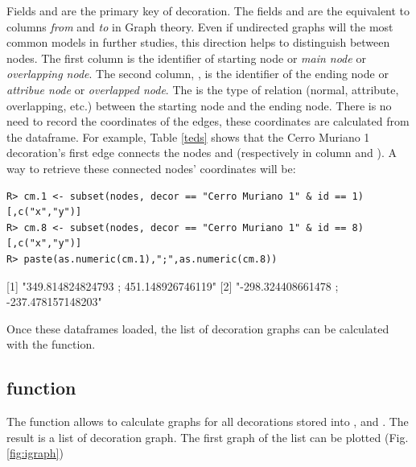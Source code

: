 \documentclass[article]{jss}\usepackage{knitr}
\begin{document}
Fields  and  are the primary key of decoration. The fields  and  are the equivalent to columns \emph{from} and \emph{to} in Graph theory. Even if undirected graphs will the most common models in further studies, this direction helps to distinguish between nodes. The first column  is the identifier of starting node or \emph{main node} or \emph{overlapping node}. The second column, , is the identifier of the ending node or \emph{attribue node} or \emph{overlapped node}. The  is the type of relation (normal, attribute, overlapping, etc.) between the starting node and the ending node. There is no need to record the coordinates of the edges, these coordinates are calculated from the  dataframe. For example, Table \ref{teds} shows that the Cerro Muriano 1 decoration's first edge connects the nodes  and  (respectively in column  and ). A way to retrieve these connected nodes' coordinates will be:

\begin{kframe}
\begin{verbatim}
R> cm.1 <- subset(nodes, decor == "Cerro Muriano 1" & id == 1)[,c("x","y")]
R> cm.8 <- subset(nodes, decor == "Cerro Muriano 1" & id == 8)[,c("x","y")]
R> paste(as.numeric(cm.1),";",as.numeric(cm.8))
\end{verbatim}
\end{kframe}[1] "349.814824824793 ; 451.148926746119"  
[2] "-298.324408661478 ; -237.478157148203"


Once these dataframes loaded, the list of decoration graphs can be calculated with the  function.

\subsection{ function} \label{sec:funlistdec}

The  function allows to calculate graphs for all decorations stored into ,  and . The result is a list of decoration graph. The first graph of the list can be plotted (Fig. \ref{fig:igraph})
\end{document}

